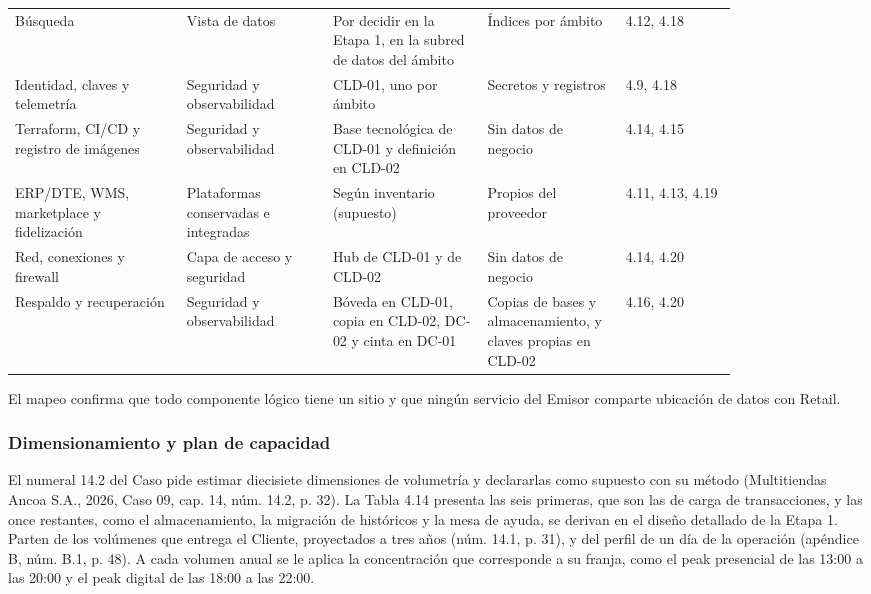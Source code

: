 \documentclass[11pt]{article}
\begin{document}
\begin{longtable}{@{}p{0.20\linewidth}p{0.17\linewidth}p{0.18\linewidth}p{0.16\linewidth}p{0.13\linewidth}@{}}
Búsqueda & Vista de datos & Por decidir en la Etapa 1, en la subred de datos del ámbito & Índices por ámbito & 4.12, 4.18 \\
Identidad, claves y telemetría & Seguridad y observabilidad & CLD-01, uno por ámbito & Secretos y registros & 4.9, 4.18 \\
Terraform, CI/CD y registro de imágenes & Seguridad y observabilidad & Base tecnológica de CLD-01 y definición en CLD-02 & Sin datos de negocio & 4.14, 4.15 \\
ERP/DTE, WMS, marketplace y fidelización & Plataformas conservadas e integradas & Según inventario (supuesto) & Propios del proveedor & 4.11, 4.13, 4.19 \\
Red, conexiones y firewall & Capa de acceso y seguridad & Hub de CLD-01 y de CLD-02 & Sin datos de negocio & 4.14, 4.20 \\
Respaldo y recuperación & Seguridad y observabilidad & Bóveda en CLD-01, copia en CLD-02, DC-02 y cinta en DC-01 & Copias de bases y almacenamiento, y claves propias en CLD-02 & 4.16, 4.20 \\
\end{longtable}

El mapeo confirma que todo componente lógico tiene un sitio y que ningún servicio del Emisor comparte ubicación de datos con Retail.

\subsubsection{Dimensionamiento y plan de capacidad}

El numeral 14.2 del Caso pide estimar diecisiete dimensiones de volumetría y declararlas como supuesto con su método (Multitiendas Ancoa S.A., 2026, Caso 09, cap. 14, núm. 14.2, p. 32). La Tabla 4.14 presenta las seis primeras, que son las de carga de transacciones, y las once restantes, como el almacenamiento, la migración de históricos y la mesa de ayuda, se derivan en el diseño detallado de la Etapa 1. Parten de los volúmenes que entrega el Cliente, proyectados a tres años (núm. 14.1, p. 31), y del perfil de un día de la operación (apéndice B, núm. B.1, p. 48). A cada volumen anual se le aplica la concentración que corresponde a su franja, como el peak presencial de las 13:00 a las 20:00 y el peak digital de las 18:00 a las 22:00.

\par\vspace{0pt plus 10\baselineskip}\vspace{0pt plus -10\baselineskip}
\end{document}
